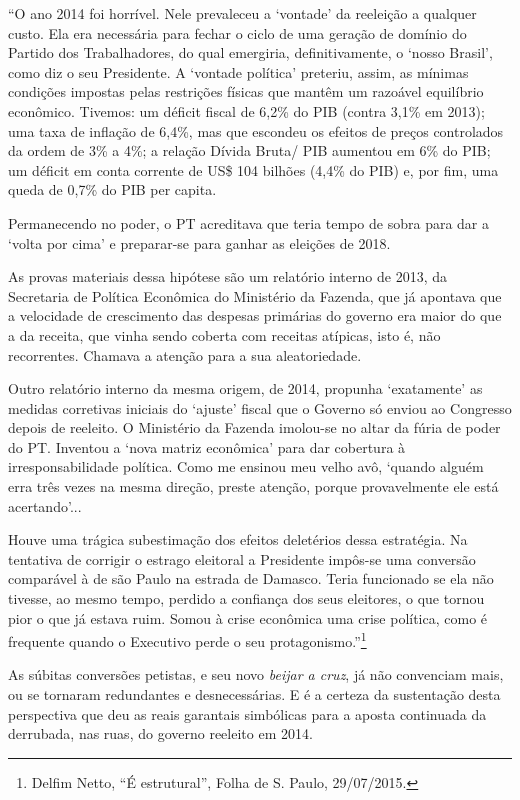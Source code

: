 ``O ano 2014 foi horrível. Nele prevaleceu a `vontade' da reeleição a
qualquer custo. Ela era necessária para fechar o ciclo de uma geração de
domínio do Partido dos Trabalhadores, do qual emergiria,
definitivamente, o `nosso Brasil', como diz o seu Presidente. A `vontade
política' preteriu, assim, as mínimas condições impostas pelas
restrições físicas que mantêm um razoável equilíbrio econômico. Tivemos:
um déficit fiscal de 6,2\% do PIB (contra 3,1\% em 2013); uma taxa de
inflação de 6,4\%, mas que escondeu os efeitos de preços controlados da
ordem de 3\% a 4\%; a relação Dívida Bruta/ PIB aumentou em 6\% do PIB;
um déficit em conta corrente de US\$ 104 bilhões (4,4\% do PIB) e, por
fim, uma queda de 0,7\% do PIB per capita.

Permanecendo no poder, o PT acreditava que teria tempo de sobra para dar
a `volta por cima' e preparar-se para ganhar as eleições de 2018.

As provas materiais dessa hipótese são um relatório interno de 2013, da
Secretaria de Política Econômica do Ministério da Fazenda, que já
apontava que a velocidade de crescimento das despesas primárias do
governo era maior do que a da receita, que vinha sendo coberta com
receitas atípicas, isto é, não recorrentes. Chamava a atenção para a sua
aleatoriedade.

Outro relatório interno da mesma origem, de 2014, propunha `exatamente'
as medidas corretivas iniciais do `ajuste' fiscal que o Governo só
enviou ao Congresso depois de reeleito. O Ministério da Fazenda
imolou-se no altar da fúria de poder do PT. Inventou a `nova matriz
econômica' para dar cobertura à irresponsabilidade política. Como me
ensinou meu velho avô, `quando alguém erra três vezes na mesma direção,
preste atenção, porque provavelmente ele está acertando'...

Houve uma trágica subestimação dos efeitos deletérios dessa estratégia.
Na tentativa de corrigir o estrago eleitoral a Presidente impôs-se uma
conversão comparável à de são Paulo na estrada de Damasco. Teria
funcionado se ela não tivesse, ao mesmo tempo, perdido a confiança dos
seus eleitores, o que tornou pior o que já estava ruim. Somou à crise
econômica uma crise política, como é frequente quando o Executivo perde
o seu protagonismo.''\footnote{Delfim Netto, ``É estrutural'', Folha de
  S. Paulo, 29/07/2015.}

As súbitas conversões petistas, e seu novo \emph{beijar a cruz}, já não
convenciam mais, ou se tornaram redundantes e desnecessárias. E é a
certeza da sustentação desta perspectiva que deu as reais garantais
simbólicas para a aposta continuada da derrubada, nas ruas, do governo
reeleito em 2014.

